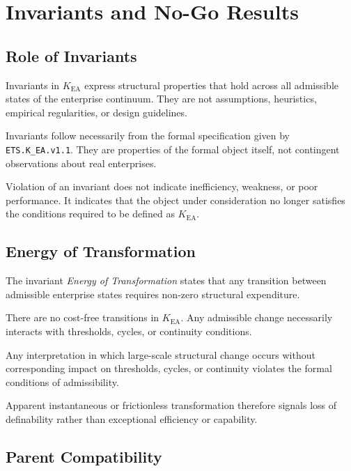 
\section{Invariants and No-Go Results}

\subsection{Role of Invariants}

Invariants in $K_{\mathrm{EA}}$ express structural properties that hold
across all admissible states of the enterprise continuum.
They are not assumptions, heuristics, empirical regularities, or design
guidelines.

Invariants follow necessarily from the formal specification given by
\texttt{ETS.K\_EA.v1.1}.
They are properties of the formal object itself, not contingent
observations about real enterprises.

Violation of an invariant does not indicate inefficiency, weakness, or
poor performance.
It indicates that the object under consideration no longer satisfies
the conditions required to be defined as $K_{\mathrm{EA}}$.

\subsection{Energy of Transformation}

The invariant \emph{Energy of Transformation} states that any transition
between admissible enterprise states requires non-zero structural
expenditure.

There are no cost-free transitions in $K_{\mathrm{EA}}$.
Any admissible change necessarily interacts with thresholds, cycles, or
continuity conditions.

Any interpretation in which large-scale structural change occurs without
corresponding impact on thresholds, cycles, or continuity violates the
formal conditions of admissibility.

Apparent instantaneous or frictionless transformation therefore signals
loss of definability rather than exceptional efficiency or capability.

\subsection{Parent Compatibility}

